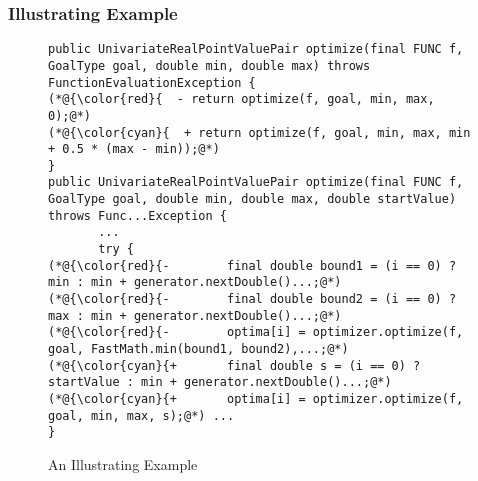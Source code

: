 \subsubsection{{\bf Illustrating Example}}
\label{sec:example}

\begin{figure}[t]
	\centering
	\begin{lstlisting}[]
public UnivariateRealPointValuePair optimize(final FUNC f, GoalType goal, double min, double max) throws FunctionEvaluationException {
(*@{\color{red}{  - return optimize(f, goal, min, max, 0);@*)
(*@{\color{cyan}{  + return optimize(f, goal, min, max, min + 0.5 * (max - min));@*)
}
public UnivariateRealPointValuePair optimize(final FUNC f, GoalType goal, double min, double max, double startValue) throws Func...Exception {
       ...
       try {
(*@{\color{red}{-        final double bound1 = (i == 0) ? min : min + generator.nextDouble()...;@*)
(*@{\color{red}{-        final double bound2 = (i == 0) ? max : min + generator.nextDouble()...;@*)
(*@{\color{red}{-        optima[i] = optimizer.optimize(f, goal, FastMath.min(bound1, bound2),...;@*)
(*@{\color{cyan}{+       final double s = (i == 0) ? startValue : min + generator.nextDouble()...;@*)
(*@{\color{cyan}{+       optima[i] = optimizer.optimize(f, goal, min, max, s);@*) ...
}
\end{lstlisting}
        \vspace{-15pt}
	\caption{An Illustrating Example}
	\label{example}
\end{figure}


